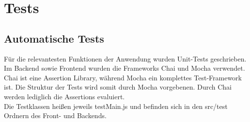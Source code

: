 \section{Tests}\label{Tests}
\subsection{Automatische Tests}
Für die relevantesten Funktionen der Anwendung wurden Unit-Tests geschrieben.
Im Backend sowie Frontend wurden die Frameworks Chai und Mocha verwendet.
Chai ist eine Assertion Library, während Mocha ein komplettes Test-Framework ist.
Die Struktur der Tests wird somit durch Mocha vorgebenen.
Durch Chai werden lediglich die Assertions evaluiert.
\\
Die Testklassen heißen jeweils testMain.js und befinden sich in den src/test Ordnern des Front- und Backends.
\\
